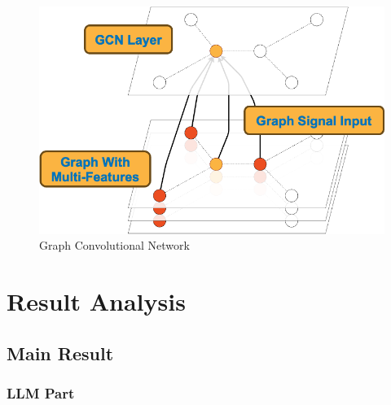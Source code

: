 \documentclass[conference]{IEEEtran}
\begin{document}
\begin{figure}[h]
    \includegraphics[width=0.8\linewidth]{gcn.png}
    \caption{Graph Convolutional Network}
    \label{fig:gcn}
\end{figure}


\section{Result Analysis}

\subsection{Main Result}

\subsubsection{LLM Part}
\end{document}
